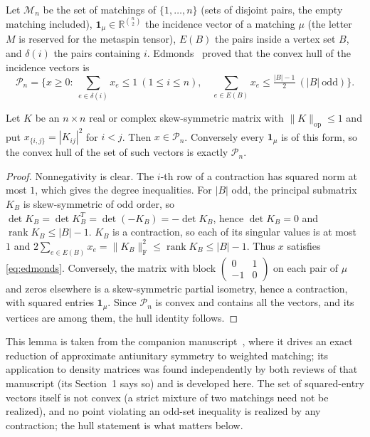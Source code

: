 \documentclass[11pt]{article}
\newcommand{\F}{\mathrm F}
\newcommand{\op}{\mathrm{op}}
\newcommand{\cM}{\mathcal M}
\newcommand{\cP}{\mathcal P}
\DeclareMathOperator{\rank}{rank}
\begin{document}
Let $\cM_n$ be the set of matchings of $\{1,\dots,n\}$ (sets of disjoint
pairs, the empty matching included), $\mathbf1_\mu\in\mathbb R^{\binom n2}$ the
incidence vector of a matching $\mu$ (the letter $M$ is reserved for the
metaspin tensor), $E(B)$ the pairs inside a vertex set $B$, and $\delta(i)$
the pairs containing $i$. Edmonds~\cite{edmonds} proved that the convex hull
of the incidence vectors is
\begin{equation}\label{eq:edmonds}
\cP_n=\Big\{x\ge0:\ \sum_{e\in\delta(i)}x_e\le1\ (1\le i\le n),\quad
\sum_{e\in E(B)}x_e\le\tfrac{|B|-1}2\ (|B|\ \text{odd})\Big\}.
\end{equation}

\begin{lemma}\label{lem:hull}
Let $K$ be an $n\times n$ real or complex skew-symmetric matrix with
$\|K\|_\op\le1$ and put $x_{\{i,j\}}=|K_{ij}|^2$ for $i<j$. Then $x\in\cP_n$.
Conversely every $\mathbf1_\mu$ is of this form, so the convex hull of the set of
such vectors is exactly $\cP_n$.
\end{lemma}

\begin{proof}
Nonnegativity is clear. The $i$-th row of a contraction has squared norm at
most $1$, which gives the degree inequalities. For $|B|$ odd, the principal
submatrix $K_B$ is skew-symmetric of odd order, so
$\det K_B=\det K_B^T=\det(-K_B)=-\det K_B$, hence $\det K_B=0$ and
$\rank K_B\le|B|-1$. $K_B$ is a contraction, so each of its singular values is
at most $1$ and $2\sum_{e\in E(B)}x_e=\|K_B\|_\F^2\le\rank K_B\le|B|-1$. Thus
$x$ satisfies \eqref{eq:edmonds}. Conversely, the matrix with block
$\left(\begin{smallmatrix}0&1\\-1&0\end{smallmatrix}\right)$ on each pair of
$\mu$ and zeros elsewhere is a skew-symmetric partial isometry, hence a
contraction, with squared entries $\mathbf1_\mu$. Since $\cP_n$ is convex and
contains all the vectors, and its vertices are among them, the hull identity
follows.
\end{proof}

This lemma is taken from the companion manuscript~\cite{ross}, where it
drives an exact reduction of approximate antiunitary symmetry to weighted
matching; its application to density matrices was found independently by
both reviews of that manuscript (its Section~1 says so) and is developed
here. The set of squared-entry
vectors itself is not convex (a strict mixture of two matchings need not be
realized), and no point violating an odd-set inequality is realized by any
contraction; the hull statement is what matters below.
\end{document}
